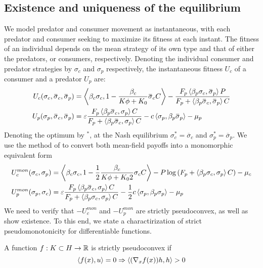 \subsection{Existence and uniqueness of the equilibrium}
We model predator and consumer movement as instantaneous, with each predator and consumer seeking to maximize its fitness at each instant. The fitness of an individual depends on the mean strategy of its own type and that of either the predators, or consumers, respectively. Denoting the individual consumer and predator strategies by $\sigma_c$ and $\sigma_p$ respectively, the instantaneous fitness $U_c$ of a consumer and a predator $U_p$ are:
\begin{align}
  U_c(\sigma_c, \overbar{\sigma}_c, \overbar{\sigma}_p) &= \ip{\beta_c \sigma_c}{1-\frac{\beta_c}{K\phi + K_0}\overbar{\sigma}_c C} - \frac{F_p \ip{\beta_p \sigma_c}{\overbar{\sigma}_p} P}{F_p + \ip{\beta_p \overbar{\sigma}_c}{\overbar{\sigma}_p} C} \\
  U_p(\sigma_p, \overbar{\sigma}_c, \overbar{\sigma}_p) &= \epsilon \frac{F_p \ip{\beta_p \overbar{\sigma}_c}{\sigma_p} C}{F_p + \ip{\beta_p \overbar{\sigma}_c}{\sigma_p} C} - c \ip{\sigma_p}{\beta_p \overbar{\sigma}_p}  - \mu_p
\end{align}
Denoting the optimum by $^*$, at the Nash equilibrium $\sigma_c^*=\overbar{\sigma}_c$ and $\sigma_p^* = \overbar{\sigma}_p$. We use the method of  to convert both mean-field payoffs into a monomorphic equivalent form 
\begin{align}
  \label{eq:mon_eq_forms}
  U_c^{mon}(\sigma_c, \sigma_p) &= \ip{\beta_c \sigma_c}{1-\frac{1}{2}\frac{\beta_c}{K\phi + K_0 2}\sigma_c C} - P\log\pa{F_p + \ip{\beta_p \sigma_c}{\sigma_p} C} - \mu_c \\
  U^{mon}_p(\sigma_p, \sigma_c) &= \epsilon \frac{F_p \ip{\beta_p \overbar{\sigma}_c}{\sigma_p} C}{F_p + \ip{\beta_p \sigma_c}{\sigma_p} C} - \frac{1}{2}c \ip{\sigma_p}{\beta_p \sigma_p}  - \mu_p
\end{align}
We need to verify that $-U_c^{mon}$ and $-U_p^{mon}$ are strictly pseudoconvex, as well as show existence. To this end, we state a charactirization of strict pseudomonotonicity for differentiable functions.
\begin{lemma}
  A function $f: K \subset H \to \mathbb{R}$ is strictly pseudoconvex if
  \begin{equation}
    \left \langle f(x),u \right \rangle = 0 \Rightarrow \left \langle (\nabla_x f(x))h,h \right \rangle > 0
  \end{equation}
\end{lemma}
